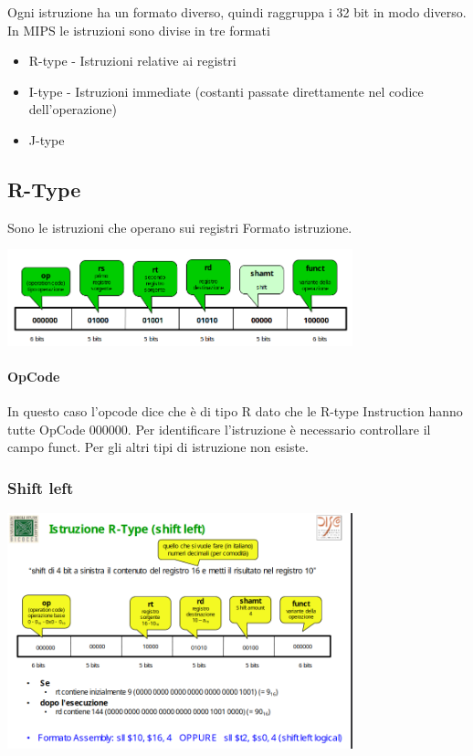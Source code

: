 \documentclass[12pt, a4paper, openany]{book}
\begin{document}
Ogni istruzione ha un formato diverso, quindi raggruppa i 32 bit in modo diverso.
In MIPS le istruzioni sono divise in tre formati
\begin{itemize}
    \item R-type - Istruzioni relative ai registri
    \item I-type - Istruzioni immediate (costanti passate direttamente nel codice dell'operazione)
    \item J-type
\end{itemize}

\subsection{R-Type}
Sono le istruzioni che operano sui registri
Formato istruzione.
\begin{center}
    \includegraphics[width=100mm, scale=0.5]{R-type format.png}
\end{center}
\paragraph*{OpCode} In questo caso l'opcode dice che è di tipo R dato che le R-type Instruction
hanno tutte OpCode 000000. Per identificare l'istruzione è necessario controllare il 
campo funct. Per gli altri tipi di istruzione non esiste.
\subsubsection*{Shift left}
\begin{center}
    \includegraphics[width=100mm, scale=0.5]{Shift left.png}
\end{center}
\end{document}
